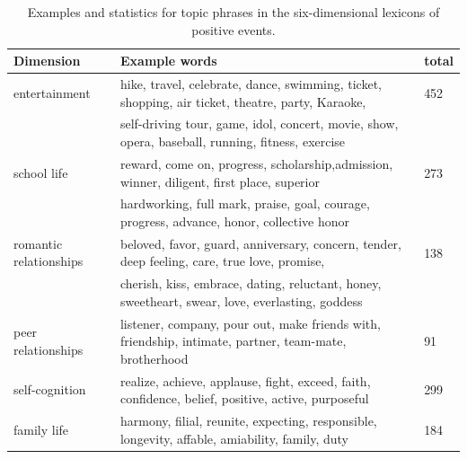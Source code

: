 \begin{table}
\centering
\caption{\small{Examples and statistics for topic phrases in the six-dimensional lexicons of positive events.}}
\label{tab:topicWords}
\small{ 
\begin{tabular}{lll} 
\toprule 
Dimension & Example words & total \\ \midrule
entertainment  & hike, travel, celebrate, dance, swimming, ticket, shopping, air ticket, theatre, party, Karaoke,& 452\\
                      & self-driving tour, game, idol, concert, movie, show, opera, baseball, running, fitness, exercise & \\
school life    & reward, come on, progress, scholarship,admission, winner, diligent, first place, superior & 273\\
				      & hardworking, full mark,  praise, goal, courage, progress, advance, honor, collective honor& \\
romantic  relationships&  beloved, favor, guard, anniversary,  concern, tender, deep feeling, care, true love, promise, & 138\\
				      & cherish, kiss, embrace, dating, reluctant, honey, sweetheart, swear, love, everlasting, goddess &\\
peer relationships  & listener, company, pour out, make friends with, friendship, intimate, partner, team-mate, brotherhood& 91\\
self-cognition & realize, achieve, applause, fight, exceed, faith, confidence, belief, positive, active, purposeful & 299\\
family life    & harmony, filial, reunite, expecting, responsible, longevity, affable, amiability, family, duty & 184\\
\bottomrule
\end{tabular}} 
\end{table} 

